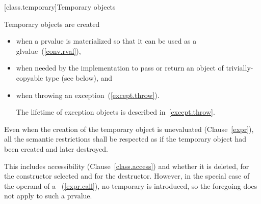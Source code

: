 [class.temporary]{Temporary objects}

\pnum
{}%
%
%
%
%
Temporary objects are created
\begin{itemize}
\item
when a prvalue is materialized so that it can be used as a glvalue~(\ref{conv.rval}),
\item
when needed by the implementation to pass or return an object of trivially-copyable type (see below),
and
\item
when throwing an exception~(\ref{except.throw}).
\begin{note}
The lifetime of exception objects is described in~\ref{except.throw}.
\end{note}
\end{itemize}
Even when the creation of the temporary object is
unevaluated (Clause~\ref{expr}),
all the semantic restrictions shall be respected as if the temporary object
had been created and later destroyed.
\begin{note}
This includes accessibility (Clause~\ref{class.access}) and whether it is deleted,
for the constructor selected and for the destructor. However, in the special
case of the operand of a
~(\ref{expr.call}), no temporary is introduced,
so the foregoing does not apply to such a prvalue.
\end{note}

